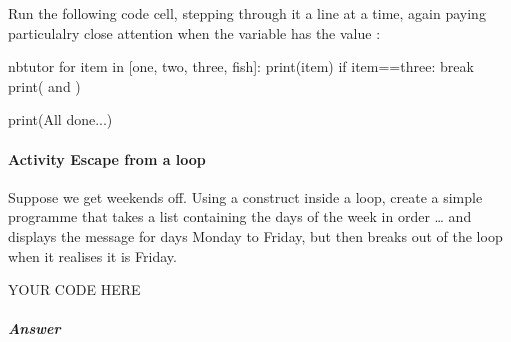 \documentclass[letterpaper,10pt,english]{sphinxmanual}
\begin{document}
{Run the following code cell, stepping through it a line at a time, again paying particulalry close attention when the  variable has the value :

{
\begin{sphinxVerbatim}[commandchars=\\\{\}]
\llap{\color{nbsphinxin}[ ]:\,\hspace{\fboxrule}\hspace{\fboxsep}}\PYGZpc{}\PYGZpc{}nbtutor
for item in [\PYGZsq{}one\PYGZsq{}, \PYGZsq{}two\PYGZsq{}, \PYGZsq{}three\PYGZsq{}, \PYGZsq{}fish\PYGZsq{}]:
    print(item)
    if item==\PYGZsq{}three\PYGZsq{}:
        break
    print(\PYGZsq{} and \PYGZsq{})

print(\PYGZsq{}All done...\PYGZsq{})
\end{sphinxVerbatim}
}


\paragraph{Activity \sphinxhyphen{} Escape from a  loop}
\label{\detokenize{content/02_Robot_Lab/Section_00_01:Activity---Escape-from-a-for...in...-loop}}
Suppose we get weekends off. Using a  construct inside a  loop, create a simple programme that takes a list containing the days of the week in order … and displays the message  for days Monday to Friday, but then breaks out of the loop when it realises it is Friday.

{
\begin{sphinxVerbatim}[commandchars=\\\{\}]
\llap{\color{nbsphinxin}[ ]:\,\hspace{\fboxrule}\hspace{\fboxsep}}\PYGZsh{} YOUR CODE HERE
\end{sphinxVerbatim}
}


\subparagraph{Answer}
\label{\detokenize{content/02_Robot_Lab/Section_00_01:id3}}

}
\end{document}
